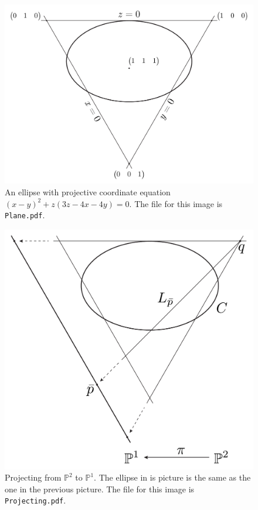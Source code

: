 \documentclass{amsart}
\numberwithin{equation}{section}
\numberwithin{thm}{section}
\theoremstyle{definition}
\numberwithin{defn}{section}
\numberwithin{ntn}{section}
\numberwithin{conj}{section}
\numberwithin{exmp}{section}
\numberwithin{rem}{section}
\theoremstyle{remark}
\begin{document}
\begin{figure}
\centering
\includegraphics[width=0.7\linewidth]{Plane/Plane}
\caption{An ellipse with projective coordinate equation $ (x - y)^{2} + z(3z - 4x - 4y) = 0 $. The file for this image is \texttt{Plane.pdf}.}
\label{fig:Plane}
\end{figure}

\begin{figure}
\centering
\includegraphics[width=0.6\linewidth]{Projecting/Projecting}
\caption{Projecting from $ \mathbb{P}^{2} $ to $ \mathbb{P}^{1} $. The ellipse in is picture is the same as the one in the previous picture. The file for this image is \texttt{Projecting.pdf}.}
\label{fig:Projecting}
\end{figure}


 
\end{document}
